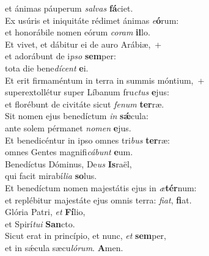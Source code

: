 \oddverse et ánimas páuperum \textit{sal}\textit{vas} \textbf{fá}ciet.\\
\evenverse Ex usúris et iniquitáte rédimet ánimas \textit{e}\textbf{ó}rum:~\*\\
\evenverse et honorábile nomen eórum \textit{co}\textit{ram} \textbf{il}lo.\\
\oddverse Et vivet, et dábitur ei de auro Arábiæ,~+\\
\oddverse  et adorábunt de i\textit{pso} \textbf{sem}per:~\*\\
\oddverse tota die bene\textit{dí}\textit{cent} \textbf{e}i.\\
\evenverse Et erit firmaméntum in terra in summis móntium,~+\\
\evenverse  superextollétur super Líbanum fru\textit{ctus} \textbf{e}jus:~\*\\
\evenverse et florébunt de civitáte sicut \textit{fe}\textit{num} \textbf{ter}ræ.\\
\oddverse Sit nomen ejus benedíctum \textit{in} \textbf{sǽ}cula:~\*\\
\oddverse ante solem pérmanet \textit{no}\textit{men} \textbf{e}jus.\\
\evenverse Et benedicéntur in ipso omnes tri\textit{bus} \textbf{ter}ræ:~\*\\
\evenverse omnes Gentes magnifi\textit{cá}\textit{bunt} \textbf{e}um.\\
\oddverse Benedíctus Dóminus, De\textit{us} \textbf{Is}raël,~\*\\
\oddverse qui facit mirabí\textit{li}\textit{a} \textbf{so}lus.\\
\evenverse Et benedíctum nomen majestátis ejus in \textit{æ}\textbf{tér}num:~\*\\
\evenverse et replébitur majestáte ejus omnis terra: \textit{fi}\textit{at}, \textbf{fi}at.\\
\oddverse Glória Patri, \textit{et} \textbf{Fí}lio,~\*\\
\oddverse et Spirí\textit{tu}\textit{i} \textbf{San}cto.\\
\evenverse Sicut erat in princípio, et nunc, \textit{et} \textbf{sem}per,~\*\\
\evenverse et in sǽcula sæcu\textit{ló}\textit{rum}. \textbf{A}men.\\
